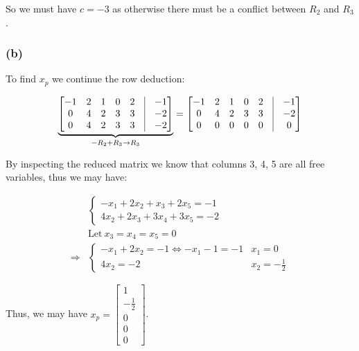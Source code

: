 \documentclass[11pt]{article}
\providecommand{\qbm}[1]{\begin{bmatrix} #1 \end{bmatrix}}
\begin{document}
So we must have $c = -3$ as otherwise there must be a conflict between $R_2$ and $R_3$.

\subsubsection*{(b)}

To find $x_p$ we continue the row deduction:

\begin{align*}
    \underbrace{\qbm{-1 & 2 & 1 & 0 & 2 & \vline & -1 \\
        0 & 4 & 2 & 3 & 3 & \vline & -2 \\
        0 & 4 & 2 & 3 & 3 & \vline & -2}}_{-R_2 + R_3 \to R_3} =
        \qbm{-1 & 2 & 1 & 0 & 2 & \vline & -1 \\
    0 & 4 & 2 & 3 & 3 & \vline & -2 \\
    0 & 0 & 0 & 0 & 0 & \vline & 0}
\end{align*}

By inspecting the reduced matrix we know that columns 3, 4, 5 are all free variables, thus we may have:

\begin{align*}
    &\begin{cases}
        -x_1 + 2x_2 + x_3 + 2x_5 = -1 \\
        4x_2 + 2x_3 + 3x_4 + 3x_5 = -2
    \end{cases} \\
    &\text{Let} \ x_3 = x_4 =x_5 = 0 \\
    \Longrightarrow &\begin{cases}
        -x_1 + 2x_2 = -1 \Longleftrightarrow -x_1 - 1 = -1 & x_1 = 0 \\
        4x_2 = -2 & x_2 = -\frac{1}{2}
    \end{cases}
\end{align*}

Thus, we may have $x_p = \qbm{1 \\ -\frac{1}{2} \\ 0 \\ 0 \\ 0}$.
\end{document}
